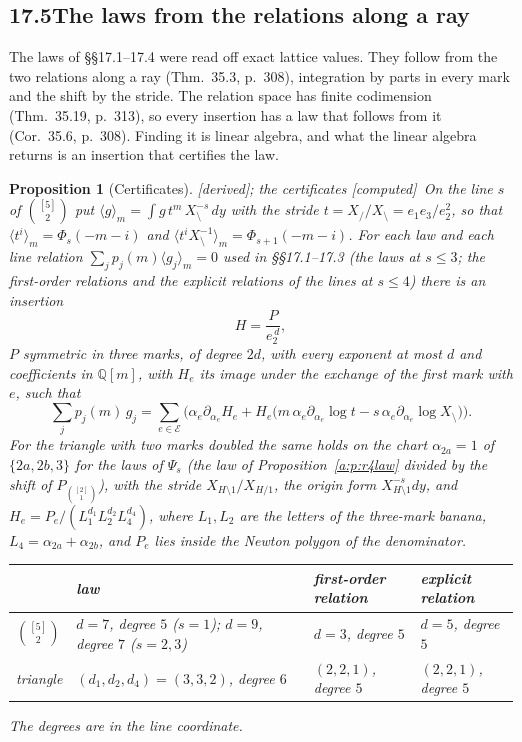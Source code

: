 \documentclass[11pt]{article}
\newcommand{\cE}{\mathcal E}
\theoremstyle{plain}
\newtheorem{proposition}{Proposition}[section]
\theoremstyle{definition}
\theoremstyle{remark}
\newcommand{\derived}{\textup{[derived]}}
\newcommand{\computed}{\textup{[computed]}}
\begin{document}
\subsection*{17.5\quad The laws from the relations along a ray}

The laws of \S\S17.1--17.4 were read off exact lattice values. They follow from the two relations along a ray (Thm.~35.3, p.~308), integration by parts in every mark and the shift by the stride. The relation space has finite codimension (Thm.~35.19, p.~313), so every insertion has a law that follows from it (Cor.~35.6, p.~308). Finding it is linear algebra, and what the linear algebra returns is an insertion that certifies the law.

\begin{proposition}[Certificates]\label{a:p:certs}\derived; the certificates \computed\
On the line $s$ of $\binom{[5]}2$ put $\langle g\rangle_m=\int g\,t^m\,X_{\setminus}^{-s}\,dy$ with the stride $t=X_{/}/X_{\setminus}=e_1e_3/e_2^2$, so that $\langle t^i\rangle_m=\Phi_s(-m-i)$ and $\langle t^iX_{\setminus}^{-1}\rangle_m=\Phi_{s+1}(-m-i)$. For each law and each line relation $\sum_jp_j(m)\langle g_j\rangle_m=0$ used in \S\S17.1--17.3 (the laws at $s\le3$; the first-order relations and the explicit relations of the lines at $s\le4$) there is an insertion
\[
H=\frac{P}{e_2^{\,d}},
\]
$P$ symmetric in three marks, of degree $2d$, with every exponent at most $d$ and coefficients in $\mathbb Q[m]$,
with $H_e$ its image under the exchange of the first mark with $e$, such that
\[
\sum_jp_j(m)\,g_j=\sum_{e\in\cE}\Big(\alpha_e\partial_{\alpha_e}H_e+H_e\big(m\,\alpha_e\partial_{\alpha_e}\log t-s\,\alpha_e\partial_{\alpha_e}\log X_{\setminus}\big)\Big).
\]
For the triangle with two marks doubled the same holds on the chart $\alpha_{2a}=1$ of $\{2a,2b,3\}$ for the laws of $\Psi_s$ (the law of Proposition~\ref{a:p:r4law} divided by the shift of $P_{\binom{[2]}1}$), with the stride $X_{H\setminus1}/X_{H/1}$, the origin form $X_{H\setminus1}^{-s}dy$, and $H_e=P_e/(L_1^{d_1}L_2^{d_2}L_4^{d_4})$, where $L_1,L_2$ are the letters of the three-mark banana, $L_4=\alpha_{2a}+\alpha_{2b}$, and $P_e$ lies inside the Newton polygon of the denominator.
\begin{center}
\small
\begin{tabular}{@{}l l l l@{}}
\toprule
& law & first-order relation & explicit relation\\ \midrule
$\binom{[5]}2$ & $d=7$, degree $5$ ($s=1$); $d=9$, degree $7$ ($s=2,3$) & $d=3$, degree $5$ & $d=5$, degree $5$\\
triangle & $(d_1,d_2,d_4)=(3,3,2)$, degree $6$ & $(2,2,1)$, degree $5$ & $(2,2,1)$, degree $5$\\
\bottomrule
\end{tabular}
\end{center}
The degrees are in the line coordinate.
\end{proposition}
\end{document}
